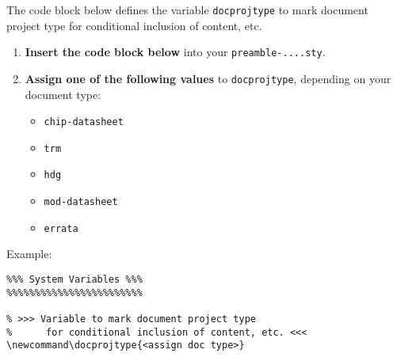 \else
    \begin{tiplisting}
      The code block below defines the variable \texttt{docprojtype} to mark document project type for conditional inclusion of content, etc.
      \begin{enumerate}
        \item \textbf{Insert the code block below} into your \texttt{preamble-....sty}.
        \item \textbf{Assign one of the following values} to \texttt{docprojtype}, depending on your document type:
	    \begin{itemize}
	        \item \texttt{chip-datasheet}
	        \item \texttt{trm}
	        \item \texttt{hdg}
	        \item \texttt{mod-datasheet}
	        \item \texttt{errata}
	    \end{itemize}
      \end{enumerate}

	    Example:

\begin{lstlisting}[numbers=none]
%%%%%%%%%%%%%%%%%%%%%%%%
%%% System Variables %%%
%%%%%%%%%%%%%%%%%%%%%%%%

% >>> Variable to mark document project type
%      for conditional inclusion of content, etc. <<<
\newcommand\docprojtype{<assign doc type>}
\end{lstlisting}

    \end{tiplisting}

    \stop

\fi%